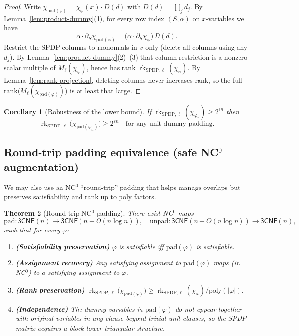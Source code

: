 \documentclass[12pt]{article}
\newtheorem{theorem}{Theorem}
\newtheorem{corollary}[theorem]{Corollary}
\theoremstyle{definition}
\theoremstyle{definition}
\theoremstyle{remark}
\theoremstyle{remark}
\begin{document}
\begin{proof}
Write $\chi_{\mathrm{pad}(\varphi)}=\chi_\varphi(x)\cdot D(d)$ with $D(d)=\prod_j d_j$.
By Lemma~\ref{lem:product-dummy}(1), for every row index $(S,\alpha)$ on $x$-variables we have
\[
\alpha\cdot\partial_S\chi_{\mathrm{pad}(\varphi)}=\bigl(\alpha\cdot\partial_S\chi_\varphi\bigr)\,D(d).
\]
Restrict the SPDP columns to monomials in $x$ only (delete all columns using any $d_j$).
By Lemma~\ref{lem:product-dummy}(2)--(3) that column-restriction is a nonzero scalar multiple of $M_\ell(\chi_\varphi)$, hence has rank $\operatorname{rk}_{\mathrm{SPDP},\ell}(\chi_\varphi)$.
By Lemma~\ref{lem:rank-projection}, deleting columns never increases rank, so the full $\mathrm{rank}\bigl(M_\ell(\chi_{\mathrm{pad}(\varphi)})\bigr)$ is at least that large.
\end{proof}

\begin{corollary}[Robustness of the lower bound]\label{cor:padding-robust}
If $\operatorname{rk}_{\mathrm{SPDP},\ell}(\chi_{\varphi_n})\ge 2^{\varepsilon n}$ then
\[
\operatorname{rk}_{\mathrm{SPDP},\ell}\bigl(\chi_{\mathrm{pad}(\varphi_n)}\bigr)\ge 2^{\varepsilon n}\quad\text{for any unit-dummy padding.}
\]
\end{corollary}

\subsection{Round-trip padding equivalence (safe NC$^0$ augmentation)}

We may also use an NC$^0$ ``round-trip'' padding that helps manage overlaps but preserves satisfiability and rank up to poly factors.

\begin{theorem}[Round-trip NC$^0$ padding]\label{thm:round-trip-nc0}
There exist NC$^0$ maps
\[
\mathrm{pad}:\mathsf{3CNF}(n)\to\mathsf{3CNF}(n+O(n\log n)),
\quad
\mathrm{unpad}:\mathsf{3CNF}(n+O(n\log n))\to\mathsf{3CNF}(n),
\]
such that for every $\varphi$:
\begin{enumerate}
\item \textbf{(Satisfiability preservation)} $\varphi$ is satisfiable iff $\mathrm{pad}(\varphi)$ is satisfiable.
\item \textbf{(Assignment recovery)} Any satisfying assignment to $\mathrm{pad}(\varphi)$ maps (in NC$^0$) to a satisfying assignment to $\varphi$.
\item \textbf{(Rank preservation)} $\operatorname{rk}_{\mathrm{SPDP},\ell}\bigl(\chi_{\mathrm{pad}(\varphi)}\bigr)\ge\operatorname{rk}_{\mathrm{SPDP},\ell}(\chi_\varphi)/\mathrm{poly}(|\varphi|)$.
\item \textbf{(Independence)} The dummy variables in $\mathrm{pad}(\varphi)$ do not appear together with original variables in any clause beyond trivial unit clauses, so the SPDP matrix acquires a block-lower-triangular structure.
\end{enumerate}
\end{theorem}
\end{document}
